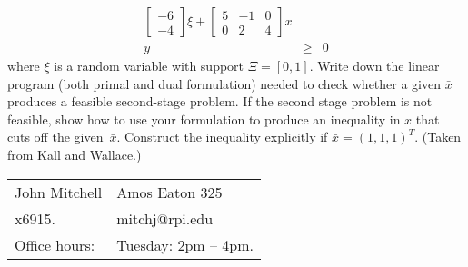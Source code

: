 \documentclass[12pt]{article}
\begin{document}
\begin{enumerate}
\begin{displaymath}
\begin{array}{rcl}
\left[\begin{array}{r}-6\\-4\end{array}\right] \xi +
\left[ \begin{array}{rrr}5&-1&0\\0&2&4\end{array}\right] x    \\
y & \geq & 0
\end{array}
\end{displaymath}
where $\xi$ is a random variable with support $\Xi = [0,1]$.
Write down the linear program (both primal and dual formulation)
needed to check whether a given $\bar{x}$ produces a feasible second-stage
problem. If the second stage problem is not feasible, show how to use your formulation to
produce an inequality in $x$ that cuts off the given~$\bar{x}$.
Construct the inequality explicitly if $\bar{x}=(1,1,1)^T$.
(Taken from Kall and Wallace.)
\end{enumerate}

\vfill

\begin{tabular}{@{\hspace{.5in}}ll}
   John Mitchell  &
   Amos Eaton 325  \\
   x6915.  &
   mitchj@rpi.edu  \\
   Office hours:  &
   Tuesday: 2pm -- 4pm.
\end{tabular}
\end{document}
